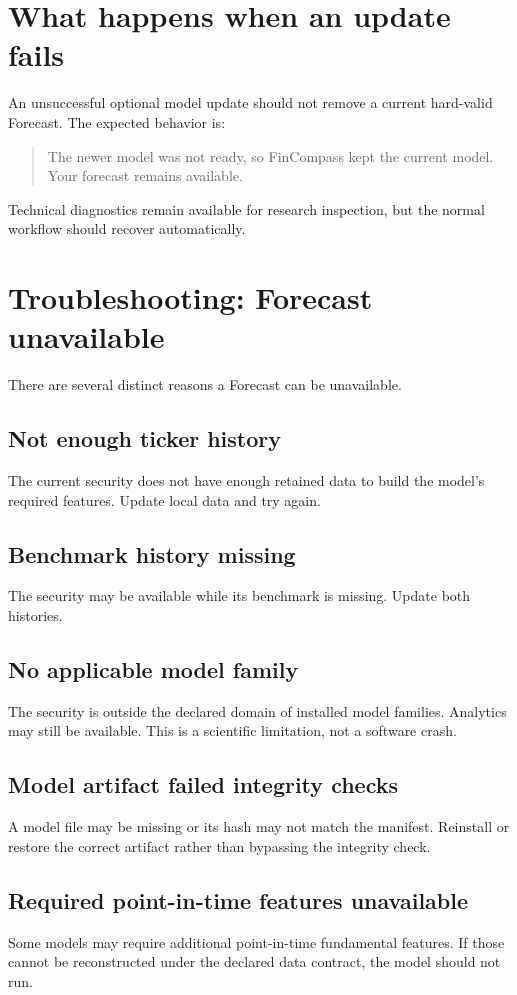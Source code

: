 \documentclass[11pt]{article}
\begin{document}
\section{What happens when an update fails}
An unsuccessful optional model update should not remove a current hard-valid Forecast. The expected behavior is:
\begin{quote}
The newer model was not ready, so FinCompass kept the current model. Your forecast remains available.
\end{quote}

Technical diagnostics remain available for research inspection, but the normal workflow should recover automatically.

\section{Troubleshooting: Forecast unavailable}
There are several distinct reasons a Forecast can be unavailable.

\subsection{Not enough ticker history}
The current security does not have enough retained data to build the model's required features. Update local data and try again.

\subsection{Benchmark history missing}
The security may be available while its benchmark is missing. Update both histories.

\subsection{No applicable model family}
The security is outside the declared domain of installed model families. Analytics may still be available. This is a scientific limitation, not a software crash.

\subsection{Model artifact failed integrity checks}
A model file may be missing or its hash may not match the manifest. Reinstall or restore the correct artifact rather than bypassing the integrity check.

\subsection{Required point-in-time features unavailable}
Some models may require additional point-in-time fundamental features. If those cannot be reconstructed under the declared data contract, the model should not run.
\end{document}
